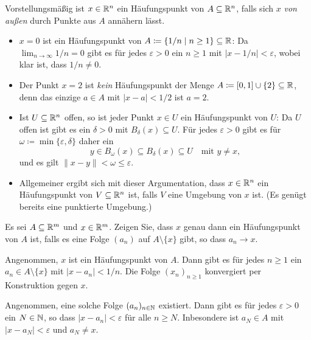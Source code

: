 \documentclass[a4paper,10pt]{article}
\begin{document}
Vorstellungsmäßig ist $x \in \mathbb{R}^n$ ein Häufungspunkt von $A \subseteq \mathbb{R}^n$, falls sich $x$ \emph{von außen} durch Punkte aus $A$ annähern lässt.


\begin{bsp}
 \begin{itemize}
  \item
   $x = 0$ ist ein Häufungspunkt von $A \coloneqq \{1/n \mid n \geq 1\} \subseteq \mathbb{R}$: Da $\lim_{n \to \infty} 1/n = 0$ gibt es für jedes $\varepsilon > 0$  ein $n \geq 1$ mit $|x-1/n| < \varepsilon$, wobei klar ist, dass $1/n \neq 0$.
  \item
   Der Punkt $x = 2$ ist \emph{kein} Häufungspunkt der Menge $A \coloneqq [0,1] \cup \{2\} \subseteq \mathbb{R}$, denn das einzige $a \in A$ mit $|x-a| < 1/2$ ist $a = 2$.
  \item
   Ist $U \subseteq \mathbb{R}^n$ offen, so ist jeder Punkt $x \in U$ ein Häufungspunkt von $U$: Da $U$ offen ist gibt es ein $\delta > 0$ mit $B_\delta(x) \subseteq U$. Für jedes $\varepsilon > 0$ gibt es für $\omega \coloneqq \min\{\varepsilon,\delta\}$ daher ein
   \[
    y \in B_\omega(x) \subseteq B_\delta(x) \subseteq U \quad \text{mit $y \neq x$},
   \]
   und es gilt $\|x-y\| < \omega \leq \varepsilon$.
  \item
   Allgemeiner ergibt sich mit dieser Argumentation, dass $x \in \mathbb{R}^n$ ein Häufungspunkt von $V \subseteq \mathbb{R}^n$ ist, falls $V$ eine Umgebung von $x$ ist. (Es genügt bereits eine punktierte Umgebung.)
 \end{itemize}
\end{bsp}


\begin{question}
 Es sei $A \subseteq \mathbb{R}^m$ und $x \in \mathbb{R}^m$. Zeigen Sie, dass $x$ genau dann ein Häufungspunkt von $A$ ist, falls es eine Folge $(a_n)$ auf $A \setminus \{x\}$ gibt, so dass $a_n \to x$.
\end{question}
\begin{solution}
 Angenommen, $x$ ist ein Häufungspunkt von $A$. Dann gibt es für jedes $n \geq 1$ ein $a_n \in A \setminus \{x\}$ mit $|x-a_n| < 1/n$. Die Folge $(x_n)_{n \geq 1}$ konvergiert per Konstruktion gegen $x$.
 
 Angenommen, eine solche Folge $(a_n)_{n \in \mathbb{N}}$ existiert. Dann gibt es für jedes $\varepsilon > 0$ ein $N \in \mathbb{N}$, so dass $|x-a_n| < \varepsilon$ für alle $n \geq N$. Inbesondere ist $a_N \in A$ mit $|x-a_N| < \varepsilon$ und $a_N \neq x$.
\end{solution}
\end{document}
